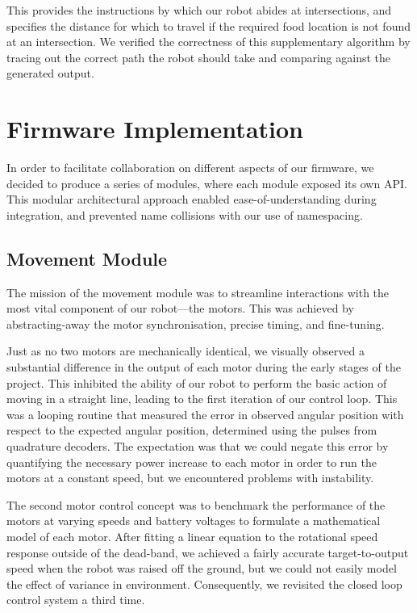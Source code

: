\documentclass[conference]{IEEEtran}
\begin{document}
This provides the instructions by which our robot abides at intersections, and specifies the distance for which to travel if the required food location is not found at an intersection.
We verified the correctness of this supplementary algorithm by tracing out the correct path the robot should take and comparing against the generated output.

\section{Firmware Implementation}

In order to facilitate collaboration on different aspects of our firmware, we decided to produce a series of modules, where each module exposed its own API.
This modular architectural approach enabled ease-of-understanding during integration, and prevented name collisions with our use of namespacing.



\subsection{Movement Module}

The mission of the movement module was to streamline interactions with the most vital component of our robot—the motors.
This was achieved by abstracting-away the motor synchronisation, precise timing, and fine-tuning.

Just as no two motors are mechanically identical, we visually observed a substantial difference in the output of each motor during the early stages of the project.
This inhibited the ability of our robot to perform the basic action of moving in a straight line, leading to the first iteration of our control loop.
This was a looping routine that measured the error in observed angular position with respect to the expected angular position, determined using the pulses from quadrature decoders.
The expectation was that we could negate this error by quantifying the necessary power increase to each motor in order to run the motors at a constant speed, but we encountered problems with instability.

The second motor control concept was to benchmark the performance of the motors at varying speeds and battery voltages to formulate a mathematical model of each motor.
After fitting a linear equation to the rotational speed response outside of the dead-band, we achieved a fairly accurate target-to-output speed when the robot was raised off the ground, but we could not easily model the effect of variance in environment.
Consequently, we revisited the closed loop control system a third time.
\end{document}
